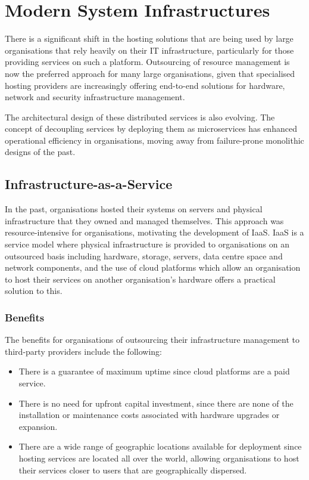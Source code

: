\section{Modern System Infrastructures} \label{ModernSystemsInfrastructures}
There is a significant shift in the hosting solutions that are being used by large organisations that rely heavily on their IT infrastructure, particularly for those providing services on such a platform. Outsourcing of resource management is now the preferred approach for many large organisations, given that specialised hosting providers are increasingly offering end-to-end solutions for hardware, network and security infrastructure management.

The architectural design of these distributed services is also evolving. The concept of decoupling services by deploying them as microservices has enhanced operational efficiency in organisations, moving away from failure-prone monolithic designs of the past.

\subsection{Infrastructure-as-a-Service} \label{IaaS}

In the past, organisations hosted their systems on servers and physical infrastructure that they owned and managed themselves. This approach was resource-intensive for organisations, motivating the development of IaaS. IaaS is a service model where physical infrastructure is provided to organisations on an outsourced basis including hardware, storage, servers, data centre space and network components, and the use of cloud platforms which allow an organisation to host their services on another organisation's hardware offers a practical solution to this. 

\subsubsection{Benefits} 
The benefits for organisations of outsourcing their infrastructure management to third-party providers include the following:

\begin{itemize}
	\item  There is a guarantee of maximum uptime since cloud platforms are a paid service.
	\item There is no need for upfront capital investment, since there are none of the installation or maintenance costs associated with hardware upgrades or expansion.
	\item There are a wide range of geographic locations available for deployment since hosting services are located all over the world, allowing organisations to host their services closer to users that are geographically dispersed.
\end{itemize}

